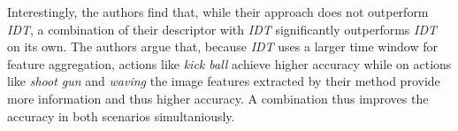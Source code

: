 Interestingly, the authors find that, while their approach does not outperform \textit{IDT}, a combination of their descriptor with \textit{IDT} significantly outperforms \textit{IDT} on its own.
The authors argue that, because \textit{IDT} uses a larger time window for feature aggregation, actions like \textit{kick ball} achieve higher accuracy while on actions like \textit{shoot gun} and \textit{waving} the image features extracted by their method provide more information and thus higher accuracy.
A combination thus improves the accuracy in both scenarios simultaniously.
